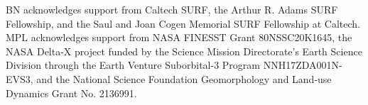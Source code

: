 \documentclass{agujournal2019}
\begin{document}
\acknowledgments
BN acknowledges support from Caltech SURF, the Arthur R. Adams SURF Fellowship, and the Saul and Joan Cogen Memorial SURF Fellowship at Caltech. MPL acknowledges support from NASA FINESST Grant 80NSSC20K1645, the NASA Delta-X project funded by the Science Mission Directorate's Earth Science Division through the Earth Venture Suborbital-3 Program NNH17ZDA001N-EVS3, and the National Science Foundation Geomorphology and Land-use Dynamics Grant No. 2136991.


\end{document}

